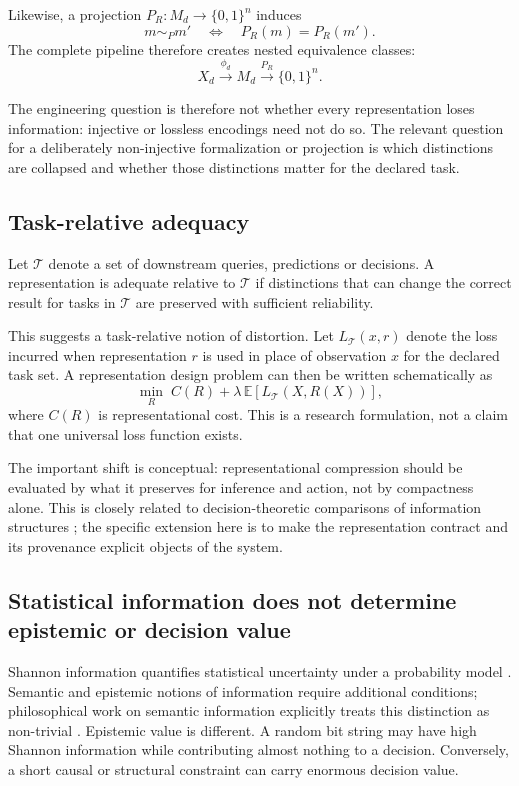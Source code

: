 \documentclass[11pt,a4paper]{article}
\newcommand{\B}{\{0,1\}}
\begin{document}
Likewise, a projection $P_R:M_d\rightarrow\B^n$ induces
\begin{equation}
m\sim_P m' \quad \Longleftrightarrow \quad P_R(m)=P_R(m').
\end{equation}
The complete pipeline therefore creates nested equivalence classes:
\begin{equation}
X_d \xrightarrow{\phi_d} M_d \xrightarrow{P_R} \B^n.
\end{equation}

The engineering question is therefore not whether every representation loses information: injective or lossless encodings need not do so. The relevant question for a deliberately non-injective formalization or projection is which distinctions are collapsed and whether those distinctions matter for the declared task.

\subsection{Task-relative adequacy}
Let $\mathcal{T}$ denote a set of downstream queries, predictions or decisions. A representation is adequate relative to $\mathcal{T}$ if distinctions that can change the correct result for tasks in $\mathcal{T}$ are preserved with sufficient reliability.

This suggests a task-relative notion of distortion. Let $L_{\mathcal{T}}(x,r)$ denote the loss incurred when representation $r$ is used in place of observation $x$ for the declared task set. A representation design problem can then be written schematically as
\begin{equation}
\min_R \; C(R)+\lambda\,\mathbb{E}[L_{\mathcal{T}}(X,R(X))],
\end{equation}
where $C(R)$ is representational cost. This is a research formulation, not a claim that one universal loss function exists.

The important shift is conceptual: representational compression should be evaluated by what it preserves for inference and action, not by compactness alone. This is closely related to decision-theoretic comparisons of information structures \cite{blackwell1953}; the specific extension here is to make the representation contract and its provenance explicit objects of the system.

\subsection{Statistical information does not determine epistemic or decision value}
Shannon information quantifies statistical uncertainty under a probability model \cite{shannon1948}. Semantic and epistemic notions of information require additional conditions; philosophical work on semantic information explicitly treats this distinction as non-trivial \cite{floridi2004}. Epistemic value is different. A random bit string may have high Shannon information while contributing almost nothing to a decision. Conversely, a short causal or structural constraint can carry enormous decision value.
\end{document}
